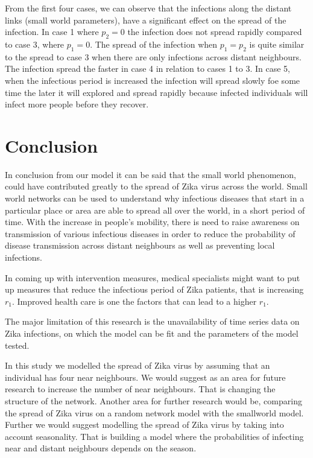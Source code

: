  From the first four cases, we can observe that the infections along the distant links  (small world parameters), have a significant effect on the spread of the infection. In case 1 where $p_2 =0$ the infection does not spread rapidly compared to case 3, where $p_1 =0$. The spread of the infection when $p_1 =p_2$ is quite similar to the spread to case 3 when there are only infections across distant neighbours. The infection spread the faster in case 4 in relation to cases 1 to 3. 
 In case 5, when the infectious period is increased the infection will spread slowly foe some time the later it will explored and spread rapidly because infected individuals will infect more people before they recover.

\section{Conclusion}

In conclusion from our model it can be said that the small world phenomenon, could have  contributed  greatly to the spread of Zika virus across the world. Small world networks can be used to understand why infectious diseases that start in a particular place or area are able to spread all over the world, in a short period of time. With  the increase in people's mobility, there is need to raise awareness on transmission of various infectious diseases in order to reduce the probability of disease transmission across distant
neighbours as well as preventing local infections. 

In coming up with intervention measures, medical specialists might want  to put up measures that reduce the infectious period of Zika patients, that is increasing $r_1$.  Improved health care is one the factors that can lead to  a higher $r_1$. 

The major limitation of this research is the unavailability of time series data on Zika infections, on which the model can be fit and the parameters of the model tested.

In this study we modelled the spread of Zika virus by assuming that an individual has four near neighbours. We would suggest as an area for future research to increase the number of near neighbours.
That is changing the structure of the network. Another area for further research would be, comparing the spread of Zika virus on a random network model with the smallworld model. Further we would suggest modelling the spread of Zika virus by taking into account seasonality. That is building a model where the probabilities of infecting near and distant neighbours depends on the season.
